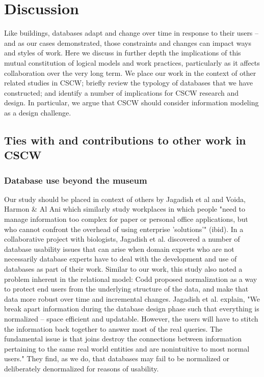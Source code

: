 \section{Discussion}

Like buildings, databases adapt and change over time in response to their users -- and as our cases demonstrated, those constraints and changes can impact ways and styles of work. Here we discuss in further depth the implications of this mutual constitution of logical models and work practices, particularly as it affects collaboration over the very long term. We place our work in the context of other related studies in CSCW; briefly review the typology of databases that we have constructed; and identify a number of implications for CSCW research and design. In particular, we argue that CSCW should consider information modeling as a design challenge.

\subsection {Ties with and contributions to other work in CSCW}
\subsubsection{Database use beyond the museum}

Our study should be placed in context of others by Jagadish et al \cite{jagadish2007making} and Voida, Harmon & Al Ani \cite{voida2011homebrew} which similarly study workplaces in which people "need to manage information too complex for paper or personal office applications, but who cannot confront the overhead of using enterprise 'solutions'" (ibid). In a collaborative project with biologists, Jagadish et al. discovered a number of database usability issues that can arise when domain experts who are not necessarily database experts have to deal with the development and use of databases as part of their work. Similar to our work, this study also noted a problem inherent in the relational model: Codd proposed normalization as a way to protect end users from the underlying structure of the data, and make that data more robust over time and incremental changes. Jagadish et al. explain, "We break apart information during the database design phase such that everything is normalized -- space efficient and updatable. However, the users will have to stitch the information back together to answer most of the real queries. The fundamental issue is that joins destroy the connections between information pertaining to the same real world entities and are nonintuitive to most normal users." \cite{jagadish2007making}  They find, as we do, that databases may fail to be normalized or deliberately denormalized for reasons of usability.

